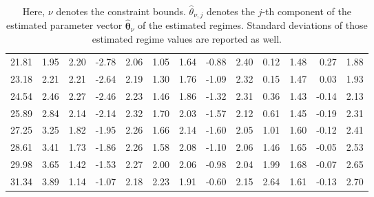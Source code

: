 \documentclass{article}
\newcommand{\wh}{\widehat}
\newcommand{\bs}{ \boldsymbol}
\begin{document}
\begin{table}[!htbp]
\begin{tabular}{rrrrrrrrrrrrr}
	21.81 &     1.95 &     2.20 &    -2.78 &     2.06  &     1.05 &     1.64 &    -0.88 &     2.40 &     0.12 &     1.48  &     0.27 &     1.88 \\ 
	23.18 &     2.21 &     2.21 &    -2.64 &     2.19  &     1.30 &     1.76 &    -1.09 &     2.32 &     0.15 &     1.47  &     0.03 &     1.93 \\ 
	24.54 &     2.46 &     2.27 &    -2.46 &     2.23  &     1.46 &     1.86 &    -1.32 &     2.31 &     0.36 &     1.43  &    -0.14 &     2.13 \\ 
	25.89 &     2.84 &     2.14 &    -2.14 &     2.32  &     1.70 &     2.03 &    -1.57 &     2.12 &     0.61 &     1.45  &    -0.19 &     2.31 \\ 
	27.25 &     3.25 &     1.82 &    -1.95 &     2.26  &     1.66 &     2.14 &    -1.60 &     2.05 &     1.01 &     1.60  &    -0.12 &     2.41 \\ 
	28.61 &     3.41 &     1.73 &    -1.86 &     2.26  &     1.58 &     2.08 &    -1.10 &     2.06 &     1.46 &     1.65  &    -0.05 &     2.53 \\ 
	29.98 &     3.65 &     1.42 &    -1.53 &     2.27  &     2.00 &     2.06 &    -0.98 &     2.04 &     1.99 &     1.68  &    -0.07 &     2.65 \\ 
	31.34 &     3.89 &     1.14 &    -1.07 &     2.18  &     2.23 &     1.91 &    -0.60 &     2.15 &     2.64 &     1.61  &    -0.13 &     2.70 \\ \hline 
\end{tabular}
\caption*{ Here, $\nu$ denotes the constraint bounds. $\wh{\theta}_{\nu,j}$ denotes the $j$-th component of the estimated parameter vector $\wh{\bs{\theta}}_{\nu}$ of the estimated regimes. Standard deviations of those estimated regime values are reported as well.}
\end{table} 
\end{document}
